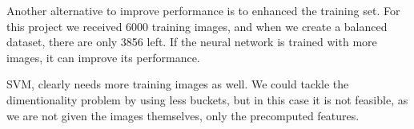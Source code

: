 \documentclass{article} %
\begin{document}
Another alternative to improve performance is to enhanced the training set. 
For this project we received 6000 training images, and when we create a balanced dataset, there are only 3856 left.
If the neural network is trained with more images, it can improve its performance.

SVM, clearly needs more training images as well. We could tackle the dimentionality problem by using less buckets, but in this case it is not feasible, as we are not given the images themselves, only the precomputed features.








\end{document}
